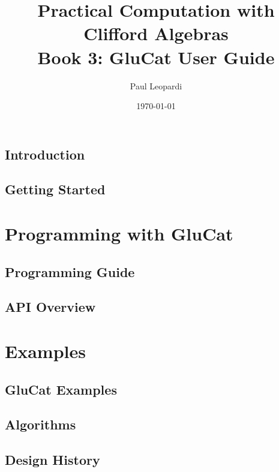 \documentclass[a4paper,11pt]{book}
\title{Practical Computation with Clifford Algebras\\
\Large Book 3: GluCat User Guide}
\author{Paul Leopardi}
\date{\today}
\begin{document}
\frontmatter
\maketitle
\tableofcontents

\chapter{Introduction}


\chapter{Getting Started}


\mainmatter

\part{Programming with GluCat}
\chapter{Programming Guide}


\chapter{API Overview}


\part{Examples}
\chapter{GluCat Examples}


\backmatter
\appendix
\chapter{Algorithms}
% 

\chapter{Design History}
% 
\end{document}
